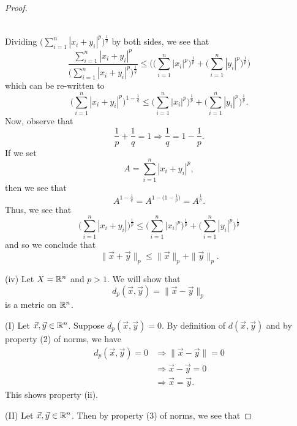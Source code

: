 \documentclass[a4paper]{article}
\begin{document}
\begin{proof}
\begin{enumerate}
\begin{align*}
        \end{align*}
\end{enumerate}
    Dividing \( \Big(  \sum_{ i=1  }^{ n } | {x}_{i} + {y}_{i} |^{p} \Big)^{\frac{ 1 }{ q } } \) by both sides, we see that 
    \[  \frac{ \sum_{ i=1  }^{ n } | {x}_{i} + {y}_{i} |^{p} }{ \Big(  \sum_{ i=1  }^{ n } | {x}_{i} + {y}_{i} |^{p} \Big)^{\frac{ 1 }{ q } } } \leq  \Bigg( \Big(  \sum_{ i=1  }^{ n } | {x}_{i} |^{p} \Big)^{\frac{ 1 }{ p }} + \Big(  \sum_{ i=1  }^{ n } | {y}_{i} |^{p} \Big)^{\frac{ 1 }{ p }}     \Bigg) \]
    which can be re-written to 
    \[  \Big(  \sum_{ i=1  }^{ n } | {x}_{i} + {y}_{i} |^{p} \Big)^{1 - \frac{ 1 }{ q } } \leq  \Big(  \sum_{ i=1  }^{ n } | {x}_{i} |^{p} \Big)^{\frac{ 1 }{ p }} + \Big(  \sum_{ i=1  }^{ n } | {y}_{i} |^{p} \Big)^{\frac{ 1 }{ p }}.   \]
    Now, observe that 
    \[  \frac{ 1 }{ p }  + \frac{ 1 }{ q }  = 1 \Longrightarrow \frac{ 1 }{ q }  = 1 - \frac{ 1 }{ p }. \]
    If we set 
    \[  A =  \sum_{ i=1  }^{ n } | {x}_{i} + {y}_{i} |^{p},   \]
    then we see that 
    \[  A^{1 - \frac{ 1 }{ q } } = A^{1 - \Big(  1 - \frac{ 1 }{ p }  \Big)} = A^{\frac{ 1 }{ p }}. \]
    Thus, we see that 
            \[  \Big( \sum_{ i=1  }^{ n } | {x}_{i} +  {y}_{i} | \Big)^{\frac{ 1 }{ p } }  \leq \Big(  \sum_{ i=1  }^{ n } | {x}_{i} |^{p} \Big)^{\frac{ 1 }{ p } } +  \Big(  \sum_{ i=1  }^{ n } | {y}_{i} |^{p} \Big)^{\frac{ 1 }{ p } }  \]
            and so we conclude that
            \[  \|\vec{ x }  + \vec{ y } \|_{p} \leq \|\vec{ x } \|_{p} + \|\vec{ y } \|_{p}. \]
    \item[(iv)] Let \( X = \mathbb{R}^{n} \) and \( p > 1  \). We will show that 
        \[  {d}_{p}(\vec{ x } , \vec{ y } ) = \|\vec{ x }  - \vec{ y } \|_{p} \]
        is a metric on \( \mathbb{R}^{n} \).
        \item[(I)] Let \( \vec{ x } ,\vec{ y }  \in \mathbb{R}^{n}  \). Suppose \( {d}_{p}(\vec{ x }, \vec{ y } ) = 0  \). By definition of \( d(\vec{ x }, \vec{ y } )  \) and by property (2) of norms, we have 
            \begin{align*}
               {d}_{p}(\vec{ x } ,\vec{ y } ) = 0  &\Longrightarrow \|\vec{ x }  - \vec{ y } \| = 0  \\
                           &\Longrightarrow \vec{ x }  - \vec{ y }  = 0 \\
                           &\Longrightarrow \vec{ x }  = \vec{ y } .
            \end{align*}
            This shows property (ii).
        \item[(II)] Let \( \vec{ x } ,\vec{ y }  \in \mathbb{R}^{n}  \). Then by property (3) of norms, we see that 

\end{proof}
\end{document}
